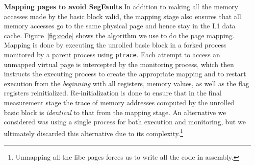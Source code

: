 \textbf{Mapping pages to avoid SegFaults}
In addition to making all the memory accesses made by the basic block valid,
the mapping stage also ensures that all memory accesses go to the same physical page and hence stay in the L1 data cache. 
Figure~\ref{fig:code} shows the algorithm we use to do the page mapping.
Mapping is done by executing the unrolled basic block in a forked process
 monitored by a parent process using \verb|ptrace|.
Each attempt to access an unmapped virtual page is intercepted by
the monitoring process, which then instructs the 
executing process to create the appropriate mapping
and to restart execution from the \textit{beginning}
with all registers, memory values,
as well as the flag registers reinitialized.
Re-initialization is done to ensure that in the final measurement
stage the trace of memory addresses computed by the 
unrolled basic block is \textit{identical} to that from the mapping stage.
An alternative we considered was using a single process for both execution
and monitoring, but we ultimately discarded this alternative due to
its complexity.\footnote{Unmapping all the libc pages forces us to write all the code in assembly.}


%    
%    
%    
%    
%    


